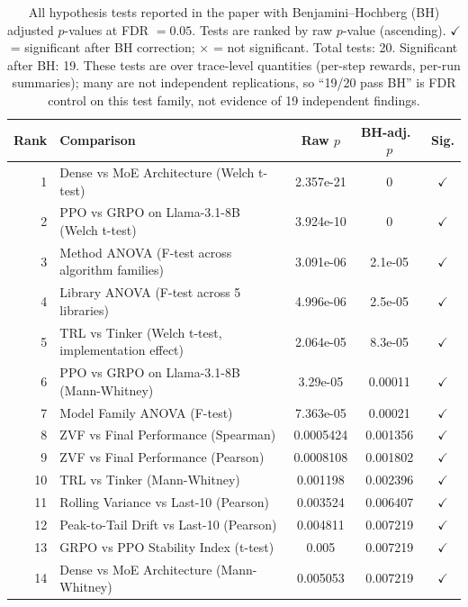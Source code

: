 \documentclass{article}
\begin{document}
\begin{table}[!ht]
\centering
\caption{All hypothesis tests reported in the paper with Benjamini--Hochberg (BH) adjusted
         $p$-values at FDR $= 0.05$.  Tests are ranked by raw $p$-value (ascending).
         $\checkmark$ = significant after BH correction; $\times$ = not significant.
         Total tests: 20.  Significant after BH: 19.  These tests are over
         trace-level quantities (per-step rewards, per-run summaries); many are
         not independent replications, so ``19/20 pass BH'' is FDR control on
         this test family, not evidence of 19 independent findings.}
\label{tab:bh-pvalues}
\scriptsize
\begin{tabular}{@{}rp{6.2cm}ccc@{}}
\toprule
Rank & Comparison & Raw $p$ & BH-adj.\ $p$ & Sig. \\
\midrule
        1 & Dense vs MoE Architecture (Welch t-test) & 2.357e-21 & 0 & $\checkmark$ \\
        2 & PPO vs GRPO on Llama-3.1-8B (Welch t-test) & 3.924e-10 & 0 & $\checkmark$ \\
        3 & Method ANOVA (F-test across algorithm families) & 3.091e-06 & 2.1e-05 & $\checkmark$ \\
        4 & Library ANOVA (F-test across 5 libraries) & 4.996e-06 & 2.5e-05 & $\checkmark$ \\
        5 & TRL vs Tinker (Welch t-test, implementation effect) & 2.064e-05 & 8.3e-05 & $\checkmark$ \\
        6 & PPO vs GRPO on Llama-3.1-8B (Mann-Whitney) & 3.29e-05 & 0.00011 & $\checkmark$ \\
        7 & Model Family ANOVA (F-test) & 7.363e-05 & 0.00021 & $\checkmark$ \\
        8 & ZVF vs Final Performance (Spearman) & 0.0005424 & 0.001356 & $\checkmark$ \\
        9 & ZVF vs Final Performance (Pearson) & 0.0008108 & 0.001802 & $\checkmark$ \\
        10 & TRL vs Tinker (Mann-Whitney) & 0.001198 & 0.002396 & $\checkmark$ \\
        11 & Rolling Variance vs Last-10 (Pearson) & 0.003524 & 0.006407 & $\checkmark$ \\
        12 & Peak-to-Tail Drift vs Last-10 (Pearson) & 0.004811 & 0.007219 & $\checkmark$ \\
        13 & GRPO vs PPO Stability Index (t-test) & 0.005 & 0.007219 & $\checkmark$ \\
        14 & Dense vs MoE Architecture (Mann-Whitney) & 0.005053 & 0.007219 & $\checkmark$ \\

\end{tabular}
\end{table}
\end{document}
